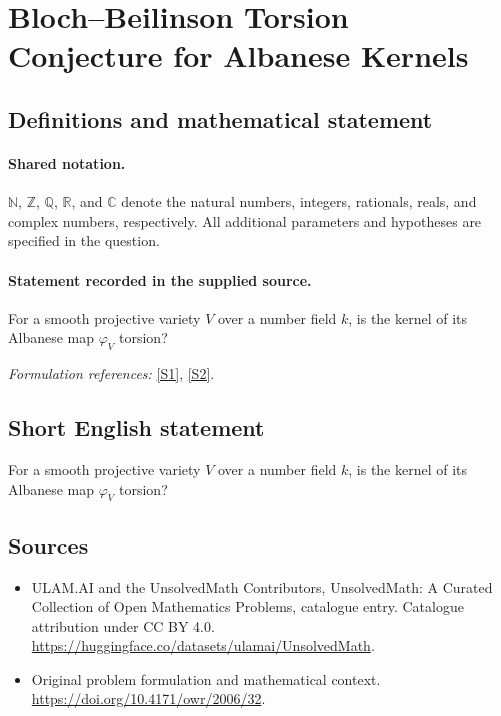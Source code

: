 \documentclass[11pt]{article}
\newcommand{\sref}[2]{\hyperlink{source:#1:#2}{[S#2]}}
\begin{document}
\section{Bloch–Beilinson Torsion Conjecture for Albanese Kernels}\label{statement}

\subsection{Definitions and mathematical statement}

\paragraph{Shared notation.}$\mathbb N$, $\mathbb Z$, $\mathbb Q$, $\mathbb R$, and $\mathbb C$ denote the natural numbers, integers, rationals, reals, and complex numbers, respectively. All additional parameters and hypotheses are specified in the question.


\paragraph{Statement recorded in the supplied source.}
For a smooth projective variety $V$ over a number field $k$, is the kernel of its Albanese map $\varphi_V$ torsion?
\par\smallskip\textit{Formulation references:} \sref{statement}{1}, \sref{statement}{2}.
\subsection{Short English statement}
For a smooth projective variety $V$ over a number field $k$, is the kernel of its Albanese map $\varphi_V$ torsion?
\subsection{Sources}
\begin{itemize}
\item[\hypertarget{source:statement:1}{S1}] ULAM.AI and the UnsolvedMath Contributors, UnsolvedMath: A Curated Collection of Open Mathematics Problems, catalogue entry. Catalogue attribution under CC BY 4.0.
\url{https://huggingface.co/datasets/ulamai/UnsolvedMath}.
\item[\hypertarget{source:statement:2}{S2}] Original problem formulation and mathematical context.
\url{https://doi.org/10.4171/owr/2006/32}.
\end{itemize}
\label{end:statement}
\end{document}
